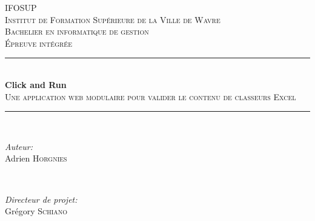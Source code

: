 \begin{titlepage}


    \newcommand{\HRule}{\rule{\linewidth}{0.5mm}} %

    \center


    \textsc{\LARGE IFOSUP}\\[0.5cm]
    \textsc{\large Institut de Formation Supérieure de la Ville de Wavre}\\[1.5cm]
    \textsc{\Large Bachelier en informatique de gestion}\\[0.5cm]
    \textsc{\large Épreuve intégrée}\\[0.5cm]


    \HRule \\[0.4cm]
    { \huge \bfseries Click and Run}\\[0.4cm]
    \textsc{\large Une application web modulaire pour valider le contenu de classeurs Excel}\\[0.5cm]
    \HRule \\[1.5cm]


    \begin{minipage}{0.4\textwidth}
        \begin{flushleft} \large
        \emph{Auteur:}\\
        Adrien \textsc{Horgnies}
        \end{flushleft}
    \end{minipage}
    ~
    \begin{minipage}{0.4\textwidth}
        \begin{flushright} \large
        \emph{Directeur de projet:} \\
        Grégory \textsc{Schiano}
        \end{flushright}
    \end{minipage}\\[2cm]


\end{titlepage}
